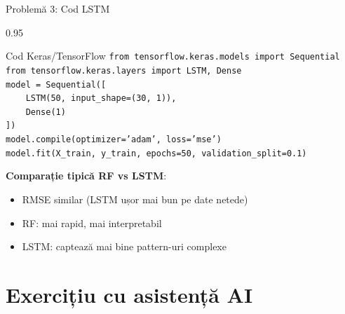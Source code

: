 \documentclass[9pt, aspectratio=169, t]{beamer}
\begin{document}
\begin{frame}{Problemă 3: Cod LSTM}
    \begin{cminipage}{0.95\textwidth}
    \begin{exampleblock}{Cod Keras/TensorFlow}
        {\footnotesize
        \texttt{from tensorflow.keras.models import Sequential}\\
        \texttt{from tensorflow.keras.layers import LSTM, Dense}\\[0.2cm]
        \texttt{model = Sequential([}\\
        \texttt{~~~~LSTM(50, input\_shape=(30, 1)),}\\
        \texttt{~~~~Dense(1)}\\
        \texttt{])}\\[0.2cm]
        \texttt{model.compile(optimizer='adam', loss='mse')}\\
        \texttt{model.fit(X\_train, y\_train, epochs=50, validation\_split=0.1)}
        }
    \end{exampleblock}

    \vspace{-1mm}
    {\scriptsize
    \textbf{Comparație tipică RF vs LSTM}:
    \begin{itemize}\setlength{\itemsep}{0pt}\parsep=0pt
        \item RMSE similar (LSTM ușor mai bun pe date netede)
        \item RF: mai rapid, mai interpretabil
        \item LSTM: captează mai bine pattern-uri complexe
    \end{itemize}
    }
    \end{cminipage}
\end{frame}

\section{Exercițiu cu asistență AI}
\end{document}
